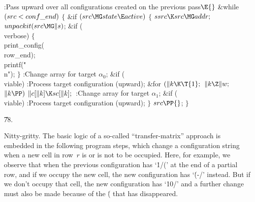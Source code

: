 \B{}:Pass upward over all configurations created on the
previous pass\X${}\E{}$\6
\&{while} ${}(\\{src}<\\{conf\_end}){}$\5
${}\{{}$\1\6
\&{if} ${}(\\{src}\MG\\{state}\E\\{active}){}$\5
${}\{{}$\1\6
${}\\{ssrc}\K\\{src}\MG\\{addr};{}$\6
${}\\{unpackit}(\\{src}\MG\|s){}$;\6
\&{if} (\\{verbose})\5
${}\{{}$\1\6
\\{print\_config}(\\{row\_end});\5
\\{printf}(\.{"\\n"});\6
\4${}\}{}$\2\6
:Change array  for target $\alpha_0$\X;\6
\&{if} (\\{viable})\1\5
:Process target configuration  (upward)\X;\2\6
\&{for} ${}(\|k\K\T{1};{}$ ${}\|k\Z\|w;{}$ ${}\|k\PP){}$\1\5
${}\|c[\|k]\K\\{sc}[\|k];{}$\2\6
:Change array  for target $\alpha_1$\X;\6
\&{if} (\\{viable})\1\5
:Process target configuration  (upward)\X;\2\6
\4${}\}{}$\2\6
${}\\{src}\PP{}$;\6
\4${}\}{}$\2\par
\U78.\fi

Nitty-gritty. The basic logic of a so-called
``transfer-matrix'' approach
is embedded in the following program steps, which change a configuration string
when a new cell in row~$r$ is or is not to be occupied. Here, for example,
we observe that when the previous configuration has `\.{1\caret/(}' at
the end of a partial row, and if we occupy the new cell, the new configuration
has `\.{(-}\caret/\thinspace' instead. But if we don't occupy that cell,
the new configuration has `\.{10}\caret/\thinspace' and a further change
must also be made because of the \.( that has disappeared.


